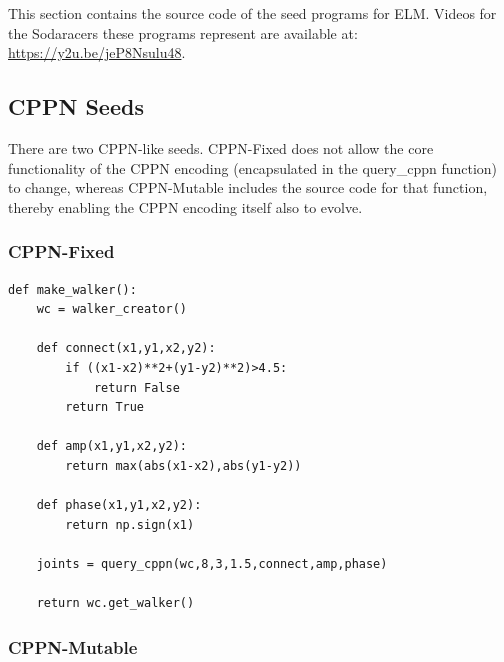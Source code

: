 \documentclass{article}
\begin{document}
This section contains the source code of the seed programs for ELM. Videos for the Sodaracers these programs represent are available at: \url{https://y2u.be/jeP8Nsulu48}.

\subsection{CPPN Seeds}

There are two CPPN-like seeds. CPPN-Fixed does not allow the core functionality of the CPPN encoding (encapsulated in the \textrm{query\_cppn} function) to
change, whereas CPPN-Mutable includes the source code for that function, thereby enabling the CPPN encoding itself also to evolve.
\label{source:cppn}


\subsubsection{CPPN-Fixed}

\begin{verbatim}
def make_walker():
    wc = walker_creator()

    def connect(x1,y1,x2,y2):
        if ((x1-x2)**2+(y1-y2)**2)>4.5:
            return False
        return True

    def amp(x1,y1,x2,y2):
        return max(abs(x1-x2),abs(y1-y2))

    def phase(x1,y1,x2,y2):
        return np.sign(x1)

    joints = query_cppn(wc,8,3,1.5,connect,amp,phase)

    return wc.get_walker()
\end{verbatim}

\subsubsection{CPPN-Mutable}
\end{document}
